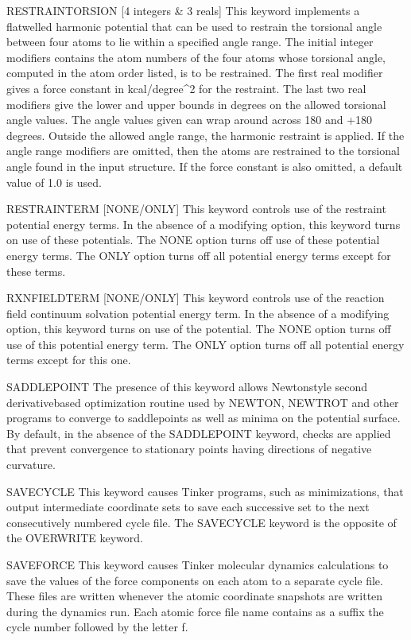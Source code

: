 \documentclass[letterpaper,11pt,english]{sphinxmanual}
\begin{document}
RESTRAIN\sphinxhyphen{}TORSION {[}4 integers \& 3 reals{]}     This keyword implements a flat\sphinxhyphen{}welled harmonic potential that can be used to restrain the torsional angle between four atoms to lie within a specified angle range. The initial integer modifiers contains the atom numbers of the four atoms whose torsional angle, computed in the atom order listed, is to be restrained. The first real modifier gives a force constant in kcal/degree\textasciicircum{}2 for the restraint. The last two real modifiers give the lower and upper bounds in degrees on the allowed torsional angle values. The angle values given can wrap around across \sphinxhyphen{}180 and +180 degrees. Outside the allowed angle range, the harmonic restraint is applied. If the angle range modifiers are omitted, then the atoms are restrained to the torsional angle found in the input structure. If the force constant is also omitted, a default value of 1.0 is used.

RESTRAINTERM {[}NONE/ONLY{]}     This keyword controls use of the restraint potential energy terms. In the absence of a modifying option, this keyword turns on use of these potentials. The NONE option turns off use of these potential energy terms. The ONLY option turns off all potential energy terms except for these terms.

RXNFIELDTERM {[}NONE/ONLY{]}     This keyword controls use of the reaction field continuum solvation potential energy term. In the absence of a modifying option, this keyword turns on use of the potential. The NONE option turns off use of this potential energy term. The ONLY option turns off all potential energy terms except for this one.

SADDLEPOINT     The presence of this keyword allows Newton\sphinxhyphen{}style second derivative\sphinxhyphen{}based optimization routine used by NEWTON, NEWTROT and other programs to converge to saddlepoints as well as minima on the potential surface. By default, in the absence of the SADDLEPOINT keyword, checks are applied that prevent convergence to stationary points having directions of negative curvature.

SAVE\sphinxhyphen{}CYCLE     This keyword causes Tinker programs, such as minimizations, that output intermediate coordinate sets to save each successive set to the next consecutively numbered cycle file. The SAVE\sphinxhyphen{}CYCLE keyword is the opposite of the OVERWRITE keyword.

SAVE\sphinxhyphen{}FORCE     This keyword causes Tinker molecular dynamics calculations to save the values of the force components on each atom to a separate cycle file. These files are written whenever the atomic coordinate snapshots are written during the dynamics run. Each atomic force file name contains as a suffix the cycle number followed by the letter f.
\end{document}

